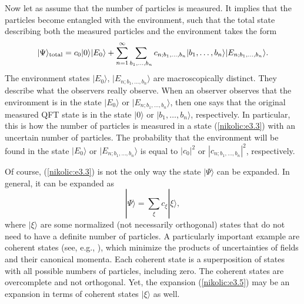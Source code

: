 \documentclass[12pt,twoside]{report} %
\begin{document}
Now let as assume that the number of particles is measured. It implies that the particles
become entangled with the environment, such that the total state describing both 
the measured particles and the environment takes the form
\begin{equation}\label{nikolic:e3.4}
 |\Psi\rangle_{\rm total}  =  c_0 |0\rangle |E_0\rangle 
 + \sum_{n=1}^{\infty} \sum_{b_1,\ldots, b_n} c_{n;b_1,\ldots,b_n}  
|b_1,\ldots, b_n\rangle |E_{n;b_1,\ldots,b_n} \rangle .
\end{equation}
The environment states $|E_0\rangle$, $|E_{n;b_1,\ldots,b_n} \rangle$ are
macroscopically distinct. They describe what the observers really observe.
When an observer observes that the environment is in the state
$|E_0\rangle$ or $|E_{n;b_1,\ldots,b_n} \rangle$, then one says that the 
original measured QFT state is in the state $|0\rangle$ or 
$|b_1,\ldots, b_n\rangle$, respectively. In particular, this is how the number of 
particles is measured in a state (\ref{nikolic:e3.3}) with an uncertain number of particles.
The probability that the environment will be found in the state
$|E_0\rangle$ or $|E_{n;b_1,\ldots,b_n} \rangle$ is 
equal to $|c_0|^2$ or $|c_{n;b_1,\ldots,b_n}|^2$, respectively.

Of course, (\ref{nikolic:e3.3}) is not the only way the state $|\Psi\rangle$ can be expanded.
In general, it can be expanded as
\begin{equation}\label{nikolic:e3.5}
 |\Psi\rangle = \sum_{\xi} c_{\xi} |\xi\rangle ,
\end{equation}
where $|\xi\rangle$ are some normalized (not necessarily orthogonal)
states that do not need to have a definite number of particles.
A particularly important example are coherent states (see, e.g., \cite{bal}),
which minimize the products of uncertainties of fields and their 
canonical momenta. Each coherent state is a superposition
of states with all possible numbers of particles, including zero. 
The coherent states are overcomplete and not orthogonal. Yet, the
expansion (\ref{nikolic:e3.5}) may be an expansion in terms of coherent states $|\xi\rangle$
as well. 
\end{document}
